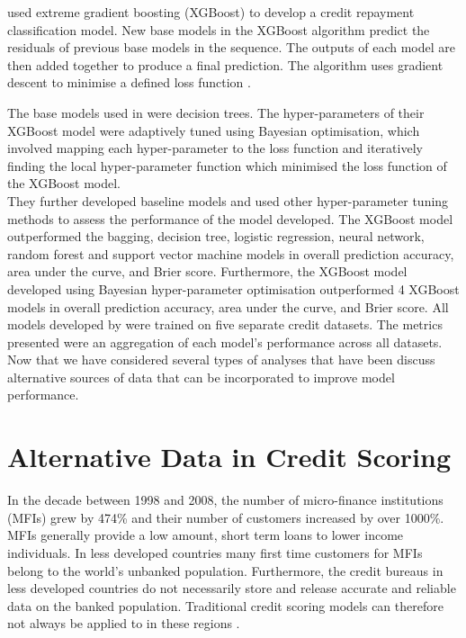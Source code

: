\textcite{Ensemble} used extreme gradient boosting (XGBoost) to develop a credit repayment classification model. New base models in the XGBoost algorithm predict the residuals of previous base models in the sequence. The outputs of each model are then added together to produce a final prediction. The algorithm uses gradient descent to minimise a defined loss function \parencite{BoostingCowan}. \newpage

The base models used in \textcite{Ensemble} were decision trees. The hyper-parameters of their XGBoost model were adaptively tuned using Bayesian optimisation, which involved mapping each hyper-parameter to the loss function and iteratively finding the local hyper-parameter function which minimised the loss function of the XGBoost model. \\

They further developed baseline models and used other hyper-parameter tuning methods to assess the performance of the model developed. The XGBoost model outperformed the bagging, decision tree, logistic regression, neural network, random forest and support vector machine models in overall prediction accuracy, area under the curve, and Brier score. Furthermore, the XGBoost model developed using Bayesian hyper-parameter optimisation outperformed 4 XGBoost models in overall prediction accuracy, area under the curve, and Brier score. All models developed by \textcite{Ensemble} were trained on five separate credit datasets. The metrics presented were an aggregation of each model's performance across all datasets. \\

Now that we have considered several types of analyses that have been  discuss alternative sources of data that can be incorporated to improve model performance.


\section{Alternative Data in Credit Scoring}

In the decade between 1998 and 2008, the number of micro-finance institutions (MFIs) grew by 474\% and their number of customers increased by over 1000\%. MFIs generally provide a low amount, short term loans to lower income individuals. In less developed countries many first time customers for MFIs belong to the world's unbanked population. Furthermore, the credit bureaus in less developed countries do not necessarily store and release accurate and reliable data on the banked population. Traditional credit scoring models can therefore not always be applied to in these regions \parencite{MFICinca}.  \\

